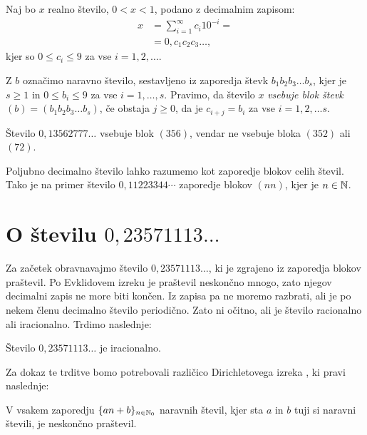 \documentclass[twoside,11pt]{article}
\begin{document}
\begin{definicija}\label{defincija blokov}
    Naj bo $x$ realno število, $ 0 < x < 1$, podano z decimalnim zapisom: 
    \[ 
        \begin{split}
            x & = \sum^{\infty}_{i=1} c_i 10^{-i} = \\
            & = 0{,}c_1c_2c_3 \dots,
        \end{split}   
    \]
    kjer so $0 \leq c_i \leq 9$ za vse $i = 1, 2, \dots$.
    
    Z $b$ označimo naravno število, sestavljeno iz zaporedja števk
    $b_1b_2b_3 \dots b_s$, 
    kjer je $s\geq 1$ in $0 \leq b_i \leq 9$ za vse $i = 1, \dots, s$.
    Pravimo, da število $x$ {\em vsebuje blok števk $(b) = (b_1b_2b_3 \dots b_s)$}, če obstaja $j \geq 0$, da je 
    $c_{i+j} = b_i$ za vse $i=1, 2, \dots s$.
\end{definicija}

\begin{zgled}
    Število $0{,}13562777 \dots$ vsebuje blok $(356)$, vendar ne vsebuje bloka $(352)$ ali $(72)$.
\end{zgled}

Poljubno decimalno število lahko razumemo kot zaporedje blokov celih števil.
Tako je na primer število $0{,}11223344 \cdots$ zaporedje blokov $(nn)$,
kjer je $n \in \mathbb{N}$.


\section{O številu $0{,}23571113 \dots$}

Za začetek obravnavajmo število $0{,}23571113 \dots$, ki je zgrajeno iz zaporedja
blokov praštevil. 
Po Evklidovem izreku \cite{Euc} je praštevil neskončno mnogo,
zato njegov decimalni zapis ne more biti končen. 
Iz zapisa pa ne moremo razbrati, ali 
je po nekem členu decimalno število periodično. Zato ni očitno, ali je število racionalno ali iracionalno.
Trdimo naslednje:

\begin{trditev}\label{trditev praštevila}
    Število $0{,}23571113 \dots$ je iracionalno.
\end{trditev}

Za dokaz te trditve bomo potrebovali različico Dirichletovega izreka \cite{Vog}, ki pravi naslednje:


\begin{izrek}\label{izrek: Dirichlet}
    V vsakem zaporedju $ \lbrace an + b \rbrace_{n \in \mathbb{N}_0}$ naravnih števil, kjer sta $a$ in $b$
    tuji si naravni števili, je neskončno praštevil.
\end{izrek}
\end{document}
